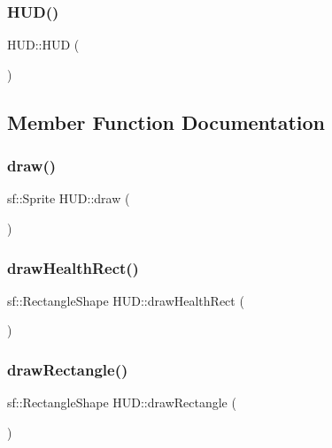 \subsubsection{\texorpdfstring{H\+U\+D()}{HUD()}}
{\footnotesize\ttfamily H\+U\+D\+::\+H\+UD (\begin{DoxyParamCaption}{ }\end{DoxyParamCaption})}



\subsection{Member Function Documentation}
\mbox{\label{class_h_u_d_a56cec922eca7a584bdc3799fbeaaf990}} 
\subsubsection{\texorpdfstring{draw()}{draw()}}
{\footnotesize\ttfamily sf\+::\+Sprite H\+U\+D\+::draw (\begin{DoxyParamCaption}{ }\end{DoxyParamCaption})}

\mbox{\label{class_h_u_d_aa87cf43eb5aa5c6e0c050f7d46064fbc}} 
\subsubsection{\texorpdfstring{draw\+Health\+Rect()}{drawHealthRect()}}
{\footnotesize\ttfamily sf\+::\+Rectangle\+Shape H\+U\+D\+::draw\+Health\+Rect (\begin{DoxyParamCaption}{ }\end{DoxyParamCaption})}

\mbox{\label{class_h_u_d_acdbc5c7a94d57dd938a3d5b8514f1d78}} 
\subsubsection{\texorpdfstring{draw\+Rectangle()}{drawRectangle()}}
{\footnotesize\ttfamily sf\+::\+Rectangle\+Shape H\+U\+D\+::draw\+Rectangle (\begin{DoxyParamCaption}{ }\end{DoxyParamCaption})}

